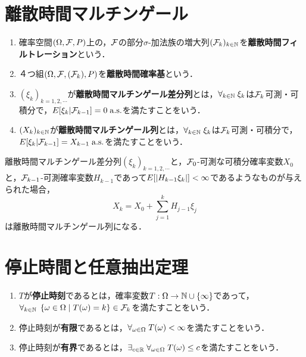 \documentclass[uplatex,dvipdfmx]{jsreport}
\begin{document}
\section{離散時間マルチンゲール}

\begin{definition}[filtration]\mbox{}
    \begin{enumerate}
        \item 確率空間$(\Omega,\mathcal{F},P)$上の，$\mathcal{F}$の部分$\sigma$-加法族の増大列$(\mathcal{F}_k)_{k\in\mathbb{N}}$を\textbf{離散時間フィルトレーション}という．
        \item ４つ組$(\Omega,\mathcal{F},(\mathcal{F}_k),P)$を\textbf{離散時間確率基}という．
        \item $(\xi_k)_{k=1,2,\cdots}$が\textbf{離散時間マルチンゲール差分列}とは，$\forall_{k\in\mathbb{N}}\;\xi_k$は$\mathcal{F}_k$可測・可積分で，$E[\xi_k|\mathcal{F}_{k-1}]=0\;\mathrm{a.s.}$を満たすことをいう．
        \item $(X_k)_{k\in\mathbb{N}}$が\textbf{離散時間マルチンゲール列}とは，$\forall_{k\in\mathbb{N}}\;\xi_k$は$\mathcal{F}_k$可測・可積分で，$E[\xi_k|\mathcal{F}_{k-1}]=X_{k-1}\;\mathrm{a.s.}$を満たすことをいう．
    \end{enumerate}
\end{definition}

\begin{lemma}
    離散時間マルチンゲール差分列$(\xi_k)_{k=1,2,\cdots}$と，$\mathcal{F}_0$-可測な可積分確率変数$X_0$と，$\mathcal{F}_{k-1}$-可測確率変数$H_{k-1}$であって$E[\lvert H_{k-1}\xi_k\rvert]<\infty$であるようなものが与えられた場合，
    \[X_k=X_0+\sum^k_{j=1}H_{j-1}\xi_j\]
    は離散時間マルチンゲール列になる．
\end{lemma}

\section{停止時間と任意抽出定理}

\begin{definition}\mbox{}
    \begin{enumerate}
        \item $T$が\textbf{停止時刻}であるとは，確率変数$T:\Omega\to\mathbb{N}\cup\{\infty\}$であって，$\forall_{k\in\mathbb{N}}\;\left\{\omega\in\Omega\mid T(\omega)=k\right\}\in\mathcal{F}_k$を満たすことをいう．
        \item 停止時刻が\textbf{有限}であるとは，$\forall_{\omega\in\Omega}\;T(\omega)<\infty$を満たすことをいう．
        \item 停止時刻が\textbf{有界}であるとは，$\exists_{c\in\mathbb{R}}\;\forall_{\omega\in\Omega}\;T(\omega)\le c$を満たすことをいう．
    \end{enumerate}
\end{definition}
\end{document}
